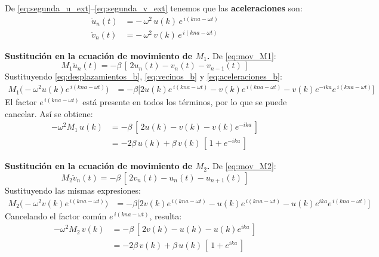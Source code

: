 \documentclass{article}
\begin{document}
De \eqref{eq:segunda_u_ext}–\eqref{eq:segunda_v_ext} tenemos que las \textbf{aceleraciones} son:
\begin{equation}
\begin{split}
\ddot{u}_{n}(t) &= -\,\omega^{2}\,u(k)\,e^{\,i(kna-\omega t)}\\
\ddot{v}_{n}(t) &= -\,\omega^{2}\,v(k)\,e^{\,i(kna-\omega t)}
\end{split}
\label{eq:aceleraciones_b}
\end{equation}


\vspace{0.4cm}
\textcolor{trueblue}{\textbf{Sustitución en la ecuación de movimiento de \(M_{1}\).}}  
De \eqref{eq:mov_M1}:
\[
M_{1}\ddot{u}_{n}(t) = -\beta\,[\,2u_{n}(t)-v_{n}(t)-v_{n-1}(t)\,]
\]
Sustituyendo \eqref{eq:desplazamientos_b}, \eqref{eq:vecinos_b} y \eqref{eq:aceleraciones_b}:
\begin{equation}
\begin{split}
M_{1}\big(-\omega^{2}u(k)e^{\,i(kna-\omega t)}\big)
&= -\beta\Big[2u(k)e^{\,i(kna-\omega t)} - v(k)e^{\,i(kna-\omega t)} - v(k)e^{-ika}e^{\,i(kna-\omega t)}\Big]
\end{split}
\end{equation}
El factor \(e^{\,i(kna-\omega t)}\) está presente en todos los términos, por lo que se puede cancelar.  
Así se obtiene:
\begin{equation}
\begin{split}
-\omega^{2}M_{1}\,u(k)
&= -\beta\,[\,2u(k)-v(k)-v(k)e^{-ika}\,]\\
&= -2\beta\,u(k)+\beta\,v(k)\,[\,1+e^{-ika}\,]
\end{split}
\label{eq:ecuacion_M1_b}
\end{equation}

\vspace{0.4cm}
\textcolor{trueblue}{\textbf{Sustitución en la ecuación de movimiento de \(M_{2}\).}}  
De \eqref{eq:mov_M2}:
\[
M_{2}\ddot{v}_{n}(t) = -\beta\,[\,2v_{n}(t)-u_{n}(t)-u_{n+1}(t)\,]
\]
Sustituyendo las mismas expresiones:
\begin{equation}
\begin{split}
M_{2}\big(-\omega^{2}v(k)e^{\,i(kna-\omega t)}\big)
&= -\beta\Big[2v(k)e^{\,i(kna-\omega t)} - u(k)e^{\,i(kna-\omega t)} - u(k)e^{ika}e^{\,i(kna-\omega t)}\Big]
\end{split}
\end{equation}
Cancelando el factor común \(e^{\,i(kna-\omega t)}\), resulta:
\begin{equation}
\begin{split}
-\omega^{2}M_{2}\,v(k)
&= -\beta\,[\,2v(k)-u(k)-u(k)e^{ika}\,]\\
&= -2\beta\,v(k)+\beta\,u(k)\,[\,1+e^{ika}\,]
\end{split}
\label{eq:ecuacion_M2_b}
\end{equation}
\end{document}
